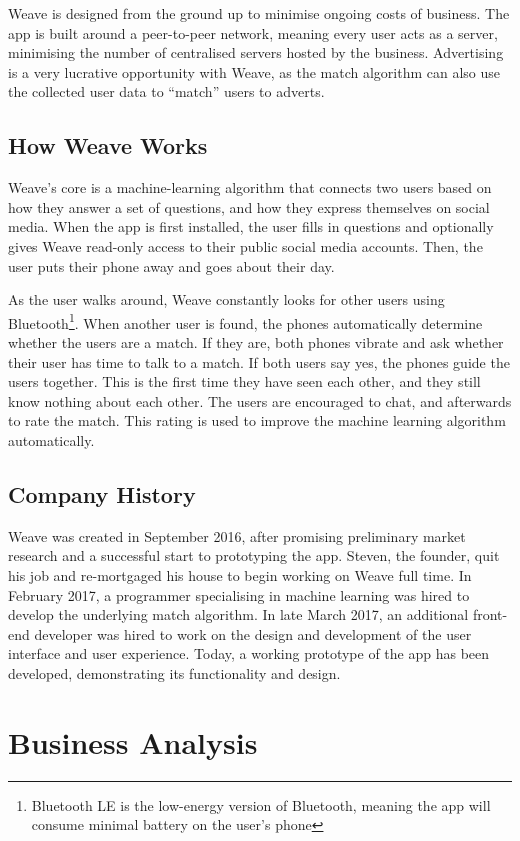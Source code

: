 \documentclass[12pt, a4paper]{article}
\let\cite\shortcite
\newenvironment{main}
{\begin{spacing}{1.2}\setlength{\parskip}{0.5\baselineskip}}
{\end{spacing}\setlength{\parskip}{0pt}}
\begin{document}
\begin{main}
Weave is designed from the ground up to minimise ongoing costs of business. The app is built around a peer-to-peer network, meaning every user acts as a server, minimising the number of centralised servers hosted by the business. Advertising is a very lucrative opportunity with Weave, as the match algorithm can also use the collected user data to ``match'' users to adverts.

\subsection{How Weave Works}
Weave's core is a machine-learning algorithm that connects two users based on how they answer a set of questions, and how they express themselves on social media. When the app is first installed, the user fills in questions and optionally gives Weave read-only access to their public social media accounts. Then, the user puts their phone away and goes about their day.

As the user walks around, Weave constantly looks for other users using Bluetooth\footnote{Bluetooth LE is the low-energy version of Bluetooth, meaning the app will consume minimal battery on the user's phone \cite{BluetoothLE}}. When another user is found, the phones automatically determine whether the users are a match. If they are, both phones vibrate and ask whether their user has time to talk to a match. If both users say yes, the phones guide the users together. This is the first time they have seen each other, and they still know nothing about each other. The users are encouraged to chat, and afterwards to rate the match. This rating is used to improve the machine learning algorithm automatically.

\subsection{Company History}
Weave was created in September 2016, after promising preliminary market research and a successful start to prototyping the app. Steven, the founder, quit his job and re-mortgaged his house to begin working on Weave full time. In February 2017, a programmer specialising in machine learning was hired to develop the underlying match algorithm. In late March 2017, an additional front-end developer was hired to work on the design and development of the user interface and user experience. Today, a working prototype of the app has been developed, demonstrating its functionality and design.

\section{Business Analysis}

\end{main}
\end{document}
